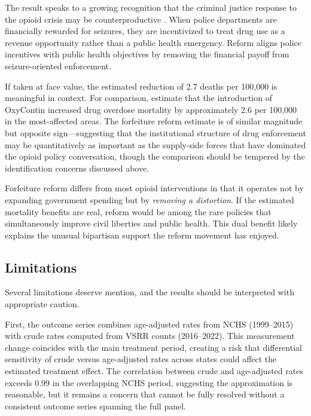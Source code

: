 \documentclass[12pt]{article}
\begin{document}
The result speaks to a growing recognition that the criminal justice response to the opioid crisis may be counterproductive \citep{mooney2022effects}. When police departments are financially rewarded for seizures, they are incentivized to treat drug use as a revenue opportunity rather than a public health emergency. Reform aligns police incentives with public health objectives by removing the financial payoff from seizure-oriented enforcement.

If taken at face value, the estimated reduction of 2.7 deaths per 100,000 is meaningful in context. For comparison, \citet{alpert2022origins} estimate that the introduction of OxyContin increased drug overdose mortality by approximately 2.6 per 100,000 in the most-affected areas. The forfeiture reform estimate is of similar magnitude but opposite sign---suggesting that the institutional structure of drug enforcement may be quantitatively as important as the supply-side forces that have dominated the opioid policy conversation, though the comparison should be tempered by the identification concerns discussed above.

Forfeiture reform differs from most opioid interventions in that it operates not by expanding government spending but by \emph{removing a distortion}. If the estimated mortality benefits are real, reform would be among the rare policies that simultaneously improve civil liberties and public health. This dual benefit likely explains the unusual bipartisan support the reform movement has enjoyed.

\subsection{Limitations}

Several limitations deserve mention, and the results should be interpreted with appropriate caution.

First, the outcome series combines age-adjusted rates from NCHS (1999--2015) with crude rates computed from VSRR counts (2016--2022). This measurement change coincides with the main treatment period, creating a risk that differential sensitivity of crude versus age-adjusted rates across states could affect the estimated treatment effect. The correlation between crude and age-adjusted rates exceeds 0.99 in the overlapping NCHS period, suggesting the approximation is reasonable, but it remains a concern that cannot be fully resolved without a consistent outcome series spanning the full panel.
\end{document}
